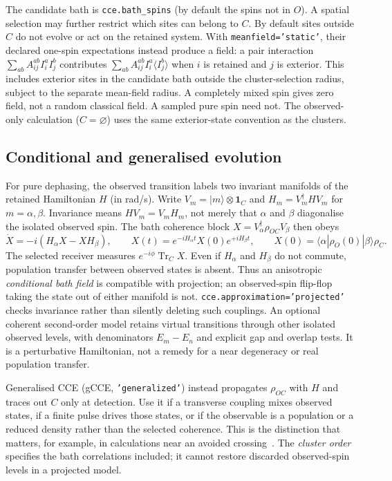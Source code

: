 \documentclass[11pt,a4paper]{article}
\newcommand{\code}[1]{\texttt{#1}}
\newcommand{\Tr}{\operatorname{Tr}}
\begin{document}
The candidate bath is \code{cce.bath\_spins} (by default the spins not in
$O$). A spatial selection may further restrict which sites can belong to
$C$. By default sites outside $C$ do not evolve or act on the retained
system. With \code{meanfield='static'}, their declared one-spin
expectations instead produce a field: a pair interaction
$\sum_{ab} A_{ij}^{ab} I_i^a I_j^b$ contributes
$\sum_{ab} A_{ij}^{ab} I_i^a\langle I_j^b\rangle$ when $i$ is retained
and $j$ is exterior. This includes exterior sites in the candidate bath
outside the cluster-selection radius, subject to the separate mean-field
radius. A completely mixed spin gives zero field, not a random classical
field. A sampled pure spin need not. The observed-only calculation
($C=\varnothing$) uses the same exterior-state convention as the clusters.

\subsection{Conditional and generalised evolution}

For pure dephasing, the observed transition labels two invariant
manifolds of the retained Hamiltonian $H$ (in rad/s). Write
$V_m=|m\rangle\otimes\mathbf{1}_C$ and $H_m=V_m^\dagger H V_m$ for
$m=\alpha,\beta$. Invariance means $HV_m=V_mH_m$, not merely that
$\alpha$ and $\beta$ diagonalise the isolated observed spin. The bath
coherence block $X=V_\alpha^\dagger\rho_{OC}V_\beta$ then obeys
\begin{equation}
  \dot X=-i(H_\alpha X-XH_\beta),\qquad
  X(t)=e^{-iH_\alpha t}X(0)e^{+iH_\beta t},\qquad
  X(0)=\langle\alpha|\rho_O(0)|\beta\rangle\rho_C.
  \label{eq:cce-theory-branches}
\end{equation}
The selected receiver measures $e^{-i\phi}\Tr_C X$. Even if $H_\alpha$
and $H_\beta$ do not commute, population transfer between observed
states is absent. Thus an anisotropic \emph{conditional bath field} is
compatible with projection; an observed-spin flip-flop taking the state
out of either manifold is not. \code{cce.approximation='projected'}
checks invariance rather than silently deleting such couplings. An
optional coherent second-order model retains virtual transitions through
other isolated observed levels, with denominators $E_m-E_n$ and explicit
gap and overlap tests. It is a perturbative Hamiltonian, not a remedy for
a near degeneracy or real population transfer.

Generalised CCE (gCCE, \code{'generalized'}) instead propagates
$\rho_{OC}$ with $H$ and traces out $C$ only at detection. Use it if a
transverse coupling mixes observed states, if a finite pulse drives those
states, or if the observable is a population or a reduced density rather
than the selected coherence. This is the distinction that matters, for
example, in calculations near an avoided crossing~\cite{cce-theory-onizhuk21}.
The \emph{cluster order} specifies the bath correlations included; it
cannot restore discarded observed-spin levels in a projected model.
\end{document}
